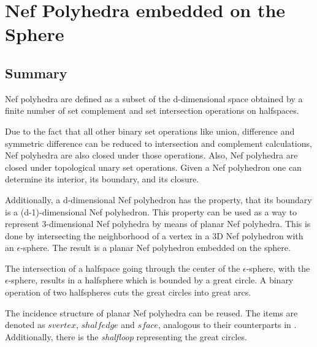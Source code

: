 
\clearpage
\chapter{Nef Polyhedra embedded on the Sphere}
\label{chapterNefpolyhedronRef}

\section*{Summary}

Nef polyhedra are defined as a subset of the d-dimensional space obtained by
a finite number of set complement and set intersection operations on
halfspaces. 

Due to the fact that all other binary set operations like union,
difference and symmetric difference can be reduced to intersection and
complement calculations, Nef polyhedra are also closed under those
operations. Also, Nef polyhedra are closed under topological unary 
set operations. Given a Nef polyhedron one can determine its interior, its
boundary, and its closure.

Additionally, a d-dimensional Nef polyhedron has the property, that its boundary
is a (d-1)-dimensional Nef polyhedron. This property can be used as a way to
represent 3-dimensional Nef polyhedra by means of planar Nef polyhedra.
This is done by intersecting the neighborhood of a vertex in a 3D Nef polyhedron
with an $\epsilon$-sphere. The result is a planar Nef polyhedron embedded
on the sphere.

The intersection of a halfspace going through the center of the $\epsilon$-sphere,
with the $\epsilon$-sphere, results in a halfsphere which is bounded by
a great circle. A binary operation of two halfspheres cuts the great circles
into great arcs.

The incidence structure of planar Nef polyhedra can be reused. The items
are denoted as $svertex$, $shalfedge$ and $sface$, analogous 
to their counterparts in . Additionally, there is the
\emph{shalfloop} representing the great circles.

%


